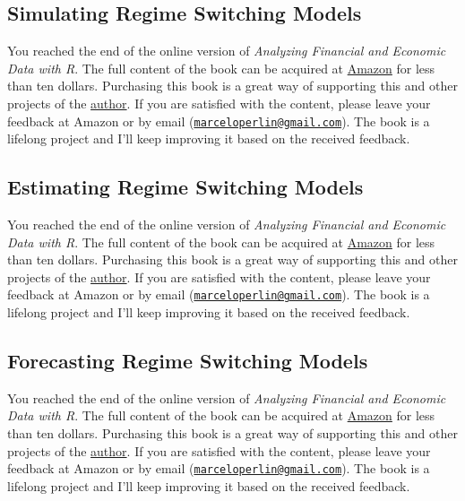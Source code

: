 \documentclass[
  12pt,
]{book}
\newenvironment{pleasebuyit}
{\begin{noteblock}
		
	} {\end{noteblock}}
\begin{document}
\hypertarget{simulating-regime-switching-models}{%
\subsection{Simulating Regime Switching Models}\label{simulating-regime-switching-models}}

\begin{pleasebuyit}
You reached the end of the online version of \emph{Analyzing Financial
and Economic Data with R}. The full content of the book can be acquired
at \href{https://www.amazon.com/dp/B084LSNXMN}{Amazon} for less than ten
dollars. Purchasing this book is a great way of supporting this and
other projects of the \href{https://www.msperlin.com/blog/}{author}. If
you are satisfied with the content, please leave your feedback at Amazon
or by email
(\href{mailto:marceloperlin@gmail.com}{\nolinkurl{marceloperlin@gmail.com}}).
The book is a lifelong project and I'll keep improving it based on the
received feedback.
\end{pleasebuyit}

\hypertarget{estimating-markov}{%
\subsection{Estimating Regime Switching Models}\label{estimating-markov}}

\begin{pleasebuyit}
You reached the end of the online version of \emph{Analyzing Financial
and Economic Data with R}. The full content of the book can be acquired
at \href{https://www.amazon.com/dp/B084LSNXMN}{Amazon} for less than ten
dollars. Purchasing this book is a great way of supporting this and
other projects of the \href{https://www.msperlin.com/blog/}{author}. If
you are satisfied with the content, please leave your feedback at Amazon
or by email
(\href{mailto:marceloperlin@gmail.com}{\nolinkurl{marceloperlin@gmail.com}}).
The book is a lifelong project and I'll keep improving it based on the
received feedback.
\end{pleasebuyit}

\hypertarget{forecasting-regime-switching-models}{%
\subsection{Forecasting Regime Switching Models}\label{forecasting-regime-switching-models}}

\begin{pleasebuyit}
You reached the end of the online version of \emph{Analyzing Financial
and Economic Data with R}. The full content of the book can be acquired
at \href{https://www.amazon.com/dp/B084LSNXMN}{Amazon} for less than ten
dollars. Purchasing this book is a great way of supporting this and
other projects of the \href{https://www.msperlin.com/blog/}{author}. If
you are satisfied with the content, please leave your feedback at Amazon
or by email
(\href{mailto:marceloperlin@gmail.com}{\nolinkurl{marceloperlin@gmail.com}}).
The book is a lifelong project and I'll keep improving it based on the
received feedback.
\end{pleasebuyit}
\end{document}
